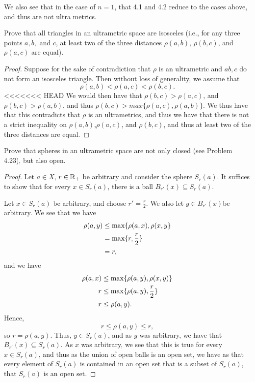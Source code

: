 We also see that in the case of $n=1$, that 4.1 and 4.2 reduce to the
cases above, and thus are not ultra metrics.

\begin{majorEx}%
    Prove that all triangles in an ultrametric space are isosceles (i.e., for
    any three points $a,b,$ and $c$, at least two of the three distances
    $\rho(a,b)$, $\rho(b,c)$, and $\rho(a, c)$ are equal).
\end{majorEx}

\begin{proof}
    Suppose for the sake of contradiction that $\rho$ is an ultrametric and $a
    b, c$ do not form an isosceles triangle. Then without loss of
    generality, we assume that
    \[
        \rho(a,b) < \rho(a,c) < \rho(b,c).
    \]
<<<<<<< HEAD
    We would then have that 
    $\rho(b,c)>\rho(a,c) $, and $\rho(b,c)>\rho(a,b)$, and thus
    $\rho(b,c)> max\{\rho(a,c), \rho(a,b)\}$. We thus have that
    this contradicts that $\rho$ is an ultrametrics, and thus we have
    that there is not a strict inequality on $\rho(a,b)$,$\rho(a,c)$,
    and $\rho(b,c)$, and thus at least two of the three distances 
    are equal.    

\end{proof}

\begin{majorEx}%
    Prove that spheres in an ultrametric space are not only closed (see Problem
    4.23), but also open.
\end{majorEx}

\begin{proof}
    Let $a \in X$, $r \in \mathbb{R}_+$ be arbitrary and consider the sphere $S_r(a)$.
    It suffices to show that for every $x \in S_r(a)$, there is a ball $B_{r'}(x)
    \subseteq S_r(a)$. 

    Let $x \in S_r(a)$ be arbitrary, and choose $r' = \frac{r}{2}$. We
    also let $y\in B_{r'}(x)$be arbitrary. We see that we have
    \begin{align*}
        \rho(a, y) &\leq \max \{\rho(a, x), \rho(x, y\} \\
        &= \max \{r, \frac{r}{2}\} \\
        &= r,
    \end{align*}
    and we have
    \begin{align*}
        \rho(a, x) &\leq \max \{\rho(a, y), \rho(x, y)\} \\
        r &\leq \max \{\rho(a, y), \frac{r}{2}\} \\
        r &\leq \rho(a, y).
    \end{align*}
    Hence,
    \[
        r \leq \rho(a, y) \leq r,
    \]
    so $r = \rho(a, y)$. Thus, $y \in S_{r}(a)$, and as $y$ was
    arbitrary, we have that $B_{r'}(x) \subseteq S_r(a)$. As $x$ was
    arbitrary, we see that this is true for every $x \in S_r(a)$, and
    thus as the union of open balls is an open set, we have as that every
    element of $S_r(a)$ is contained in an open set that is a subset
    of $S_r(a)$, that $S_r(a)$ is an open set.

\end{proof}


